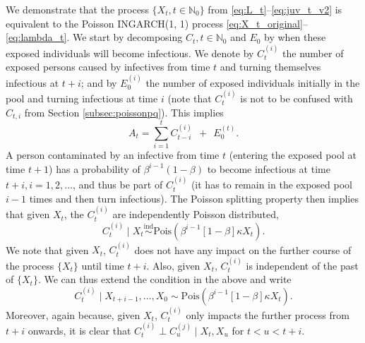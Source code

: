 \documentclass{article}
\begin{document}
We demonstrate that the process $\{X_t, t \in \mathbb{N}_0\}$ from \eqref{eq:L_t}--\eqref{eq:juv_t_v2} is equivalent to the Poisson INGARCH(1, 1) process \eqref{eq:X_t_original}--\eqref{eq:lambda_t}. We start by decomposing $C_t, t \in \mathbb{N}_0$ and $E_0$ by when these exposed individuals will become infectious. We denote by $C_t^{(i)}$ the number of exposed persons caused by infectives from time $t$ and turning themselves infectious at $t + i$; and by $E^{(i)}_0$ the number of exposed individuals initially in the pool and turning infectious at time $i$ (note that $C_t^{(i)}$ is not to be confused with $C_{t, i}$ from Section \ref{subsec:poissonpq}). This implies
\begin{equation}
A_t = \sum_{i = 1}^{t} C_{t - i}^{(i)} \ \ + \ \ E_0^{(t)}.
\label{eq:sums}
\end{equation}
A person contaminated by an infective from time $t$ (entering the exposed pool at time $t + 1$) has a probability of $\beta^{i - 1}(1 - \beta)$ to become infectious at time $t + i, i = 1, 2, \dots$, and thus be part of $C_t^{(i)}$ (it has to remain in the exposed pool $i - 1$ times and then turn infectious). The Poisson splitting property \cite{Kingman1993} then implies that given $X_t$, the $C_t^{(i)}$ are independently Poisson distributed,
$$
C_t^{(i)} \mid X_t \stackrel{\text{ind}}{\sim} \text{Pois}(\beta^{i - 1}[1 - \beta]\kappa X_t). %
$$
We note that given $X_t$, $C_t^{(i)}$ does not have any impact on the further course of the process $\{X_t\}$ until time $t + i$. Also, given $X_t$, $C_t^{(i)}$ is independent of the past of $\{X_t\}$. We can thus extend the condition in the above and write
\begin{equation}
C_t^{(i)} \mid X_{t + i - 1}, \dots, X_0 \sim \text{Pois}(\beta^{i - 1}[1 - \beta]\kappa X_t). \label{eq:conditional_Cti} %
\end{equation}
Moreover, again because, given $X_t$, $C_t^{(i)}$ only impacts the further process from $t + i$ onwards, it is clear that $C_t^{(i)} \perp C_u^{(j)} \mid X_t, X_u$ for $t < u < t + i$.
\end{document}
